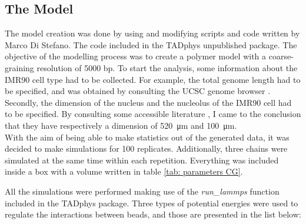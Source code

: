 
\subsection{The Model} \label{chap: the model description}
The model creation was done by using and modifying scripts and code written by Marco Di Stefano. The code included in the TADphys unpublished package.
The objective of the modelling process was to create a polymer model with a coarse-graining resolution of 5000 bp. To start the analysis, some information about the IMR90 cell type had to be collected. For example, the total genome length had to be specified, and was obtained by consulting the UCSC genome browser
\cite{UCSCGenomeBrowser}.
Secondly, the dimension of the nucleus and the nucleolus of the IMR90 cell had to be specified. By consulting some accessible literature
\cite{ehlerHumanFoetalLung1996,ingramHiCImplementationGenome2020,maiserSuperresolutionSituAnalysis2020},
I came to the conclusion that they have respectively a dimension of \SI{520}{\micro\metre} and \SI{100}{\micro\metre}.\\

With the aim of being able to make statistics out of the generated data, it was decided to make simulations for 100 replicates. Additionally, three chains were simulated at the same time within each repetition. Everything was included inside a box with a volume written in table \ref{tab: parameters CG}.

%  

All the simulations were performed making use of the \textit{run\_lammps} function included in the TADphys package.
Three types of potential energies were used to regulate the interactions between beads, and those are presented in the list below:

